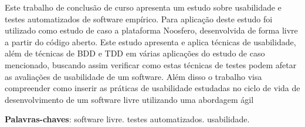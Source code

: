 \begin{resumo}

Este trabalho de conclusão de curso apresenta um estudo sobre usabilidade e testes automatizados de software empírico. Para aplicação deste estudo foi utilizado como estudo de caso a plataforma Noosfero, desenvolvida de forma livre a partir do código aberto. Este estudo apresenta e aplica técnicas de usabilidade, além de técnicas de BDD e TDD em várias aplicações do estudo de caso mencionado, buscando assim verificar como estas técnicas de testes podem afetar as avaliações de usabilidade de um software.  Além disso o trabalho visa compreender como inserir as práticas de usabilidade estudadas no ciclo de vida de desenvolvimento de um software livre utilizando uma abordagem ágil

\vspace{\onelineskip}
    
 \noindent
 \textbf{Palavras-chaves}: software livre. testes automatizados. usabilidade.

\end{resumo}

